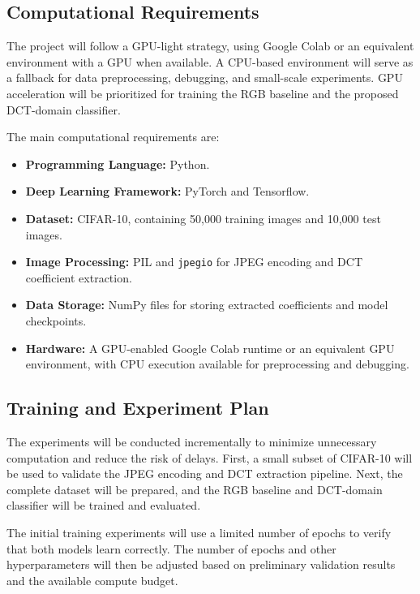 \documentclass[11pt]{article}
\begin{document}
\subsection{Computational Requirements}

The project will follow a GPU-light strategy, using Google Colab or an
equivalent environment with a GPU when available. A CPU-based environment
will serve as a fallback for data preprocessing, debugging, and small-scale
experiments. GPU acceleration will be prioritized for training the RGB
baseline and the proposed DCT-domain classifier.

The main computational requirements are:

\begin{itemize}
    \item \textbf{Programming Language:} Python.
    \item \textbf{Deep Learning Framework:} PyTorch and Tensorflow.
    \item \textbf{Dataset:} CIFAR-10, containing 50,000 training images
    and 10,000 test images.
    \item \textbf{Image Processing:} PIL and \texttt{jpegio} for JPEG
    encoding and DCT coefficient extraction.
    \item \textbf{Data Storage:} NumPy files for storing extracted
    coefficients and model checkpoints.
    \item \textbf{Hardware:} A GPU-enabled Google Colab runtime or an
    equivalent GPU environment, with CPU execution available for
    preprocessing and debugging.
\end{itemize}

\subsection{Training and Experiment Plan}

The experiments will be conducted incrementally to minimize unnecessary
computation and reduce the risk of delays. First, a small subset of CIFAR-10
will be used to validate the JPEG encoding and DCT extraction pipeline.
Next, the complete dataset will be prepared, and the RGB baseline and
DCT-domain classifier will be trained and evaluated.

The initial training experiments will use a limited number of epochs to
verify that both models learn correctly. The number of epochs and other
hyperparameters will then be adjusted based on preliminary validation
results and the available compute budget.
\end{document}
